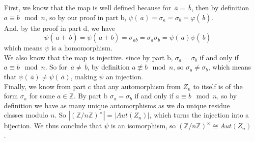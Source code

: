 \documentclass[12pt]{article}
\newcommand{\Z}{\mathbb{Z}}
\newcommand{\olsi}[1]{\,\overline{\!{#1}}}
\begin{document}
\begin{enumerate}[label=\textbf{\alph*.}]
            First, we know that the map is well defined
            because for $\olsi{a} = \olsi{b}$,
            then by definition $a \equiv b \mod n$,
            so by our proof in part b,
            $\psi(\olsi{a}) = \sigma_a = \sigma_b = \varphi(\olsi{b})$. \\
            And, by the proof in part d, we have
            \[ \psi(\olsi{a} + \olsi{b})
            = \psi(\olsi{a + b})
            = \sigma_{ab}
            = \sigma_{a}\sigma_{b} 
            = \psi(\olsi{a})\psi(\olsi{b}) \]
            which means $\psi$ is a homomorphism. \\
            We also know that the map is injective.
            since by part b, $\sigma_a = \sigma_b$
            if and only if $a \equiv b \mod n$.
            So for $\olsi{a} \neq \olsi{b}$,
            by definition $a \not\equiv b \mod n$,
            so $\sigma_a \neq \sigma_b$,
            which means that $\psi(\olsi{a}) \neq \psi(\olsi{a})$,
            making $\psi$ an injection. \\
            Finally, we know from part c that any automorphism
            from $Z_n$ to itself is of the form $\sigma_a$
            for some $a \in \Z$.
            By part b $\sigma_a = \sigma_b$
            if and only if $a \equiv b \mod n$,
            so by definition we have as many
            unique automorphisms as we do unique residue classes
            modulo $n$.
            So $|(\Z/n\Z)^\times| = |Aut(Z_n)|$,
            which turns the injection into a bijection.
            We thus conclude that $\psi$ is an isomorphism,
            so $(\Z/n\Z)^\times \cong Aut(Z_n)$.
    \end{enumerate}
\end{document}
